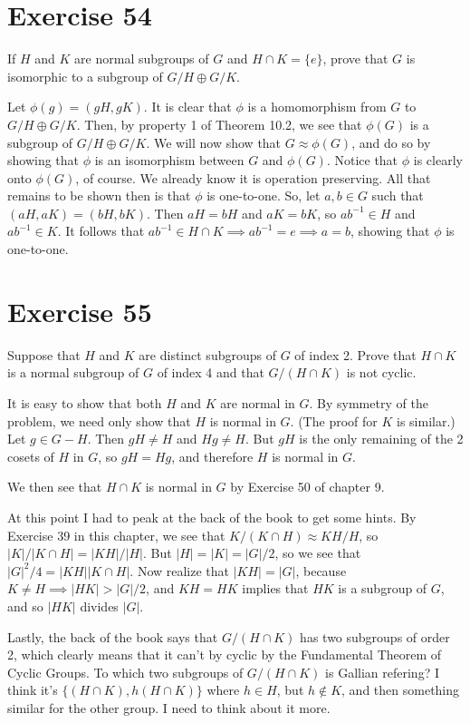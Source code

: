 \documentclass[12pt]{article}
\begin{document}
\section*{Exercise 54}

If $H$ and $K$ are normal subgroups of $G$ and $H\cap K=\{e\}$, prove that $G$
is isomorphic to a subgroup of $G/H\oplus G/K$.

Let $\phi(g)=(gH,gK)$.  It is clear that $\phi$ is a homomorphism from $G$
to $G/H\oplus G/K$.  Then, by property 1 of Theorem 10.2, we see that
$\phi(G)$ is a subgroup of $G/H\oplus G/K$.  We will now show that $G\approx\phi(G)$,
and do so by showing that $\phi$ is an isomorphism between $G$ and $\phi(G)$.
Notice that $\phi$ is clearly onto $\phi(G)$, of course.  We already know it is operation preserving.
All that remains to be shown then is that $\phi$ is one-to-one.  So, let $a,b\in G$ such that
$(aH,aK)=(bH,bK)$.  Then $aH=bH$ and $aK=bK$, so $ab^{-1}\in H$ and $ab^{-1}\in K$.
It follows that $ab^{-1}\in H\cap K\implies ab^{-1}=e\implies a=b$, showing that
$\phi$ is one-to-one.

\section*{Exercise 55}

Suppose that $H$ and $K$ are distinct subgroups of $G$ of index 2.  Prove that
$H\cap K$ is a normal subgroup of $G$ of index 4 and that $G/(H\cap K)$ is not cyclic.

It is easy to show that both $H$ and $K$ are normal in $G$.  By symmetry of the
problem, we need only show that $H$ is normal in $G$.  (The proof for $K$ is similar.)
Let $g\in G-H$.  Then $gH\neq H$ and $Hg\neq H$.  But $gH$ is the only remaining
of the 2 cosets of $H$ in $G$, so $gH=Hg$, and therefore $H$ is normal in $G$.

We then see that $H\cap K$ is normal in $G$ by Exercise 50 of chapter 9.

At this point I had to peak at the back of the book to get some hints.
By Exercise 39 in this chapter, we see that $K/(K\cap H)\approx KH/H$,
so $|K|/|K\cap H|=|KH|/|H|$.  But $|H|=|K|=|G|/2$, so we see that
$|G|^2/4=|KH||K\cap H|$.  Now realize that $|KH|=|G|$, because $K\neq H\implies |HK|>|G|/2$,
and $KH=HK$ implies that $HK$ is a subgroup of $G$, and so $|HK|$ divides $|G|$.

Lastly, the back of the book says that $G/(H\cap K)$ has two subgroups of order 2,
which clearly means that it can't by cyclic by the Fundamental Theorem of Cyclic Groups.
To which two subgroups of $G/(H\cap K)$ is Gallian refering?  I think it's
$\{(H\cap K),h(H\cap K)\}$ where $h\in H$, but $h\not\in K$, and then
something similar for the other group.  I need to think about it more.
\end{document}
